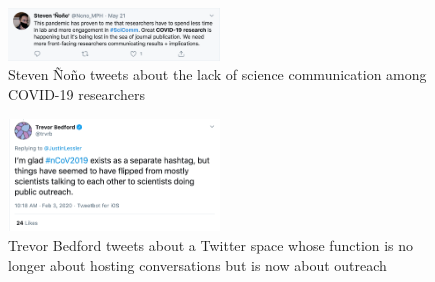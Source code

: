 \documentclass[acmsmall,authordraft]{acmart}
\begin{document}
\begin{figure}
  \includegraphics[width=0.5\textwidth]{Pictures/Appendix_Tweets/steven nono tweet.png}
  \caption{Steven \~{N}o\~{n}o tweets about the lack of science communication among COVID-19 researchers}
  \label{steven_nono_tweet}
\end{figure}

\begin{figure}
  \includegraphics[width=0.5\textwidth]{Pictures/Appendix_Tweets/trevor bedford tweet.png}
  \caption{Trevor Bedford tweets about a Twitter space whose function is no longer about hosting conversations but is now about outreach}
  \label{trevor_bedford_tweet}
\end{figure}
\end{document}
